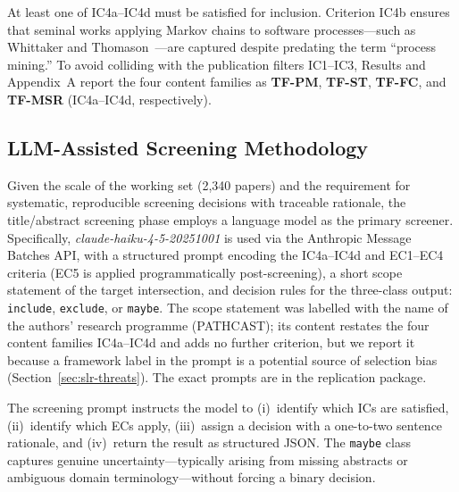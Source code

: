 At least one of IC4a--IC4d must be satisfied for inclusion. Criterion IC4b
ensures that seminal works applying Markov chains to software processes---such
as Whittaker and Thomason~\cite{whittaker1994}---are captured despite
predating the term ``process mining.''
To avoid colliding with the publication filters IC1--IC3, Results and
Appendix~A report the four content families as \textbf{TF-PM}, \textbf{TF-ST},
\textbf{TF-FC}, and \textbf{TF-MSR} (IC4a--IC4d, respectively).


\subsection{LLM-Assisted Screening Methodology}
\label{sec:slr-llm}

Given the scale of the working set (2{,}340 papers) and the requirement for
systematic, reproducible screening decisions with traceable rationale, the
title/abstract screening phase employs a language model as the primary
screener. Specifically, \textit{claude-haiku-4-5-20251001} is used via the
Anthropic Message Batches API, with a structured prompt encoding the IC4a--IC4d
and EC1--EC4 criteria (EC5 is applied programmatically post-screening), a
short scope statement of the target intersection, and decision rules for
the three-class output: \texttt{include}, \texttt{exclude}, or \texttt{maybe}.
The scope statement was labelled with the name of the authors' research
programme (PATHCAST); its content restates the four content families
IC4a--IC4d and adds no further criterion, but we report it because a
framework label in the prompt is a potential source of selection bias
(Section~\ref{sec:slr-threats}). The exact prompts are in the replication
package.

The screening prompt instructs the model to (i)~identify which ICs are
satisfied, (ii)~identify which ECs apply, (iii)~assign a decision with a
one-to-two sentence rationale, and (iv)~return the result as structured
JSON. The \texttt{maybe} class captures genuine uncertainty---typically
arising from missing abstracts or ambiguous domain terminology---without
forcing a binary decision.

